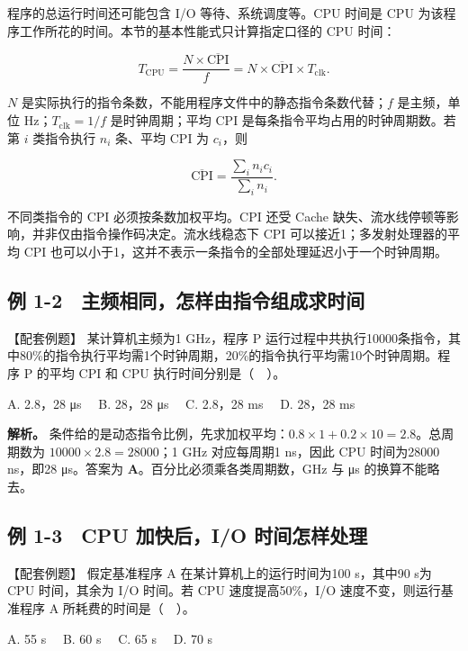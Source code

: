 程序的总运行时间还可能包含 I/O 等待、系统调度等。CPU 时间是 CPU 为该程序工作所花的时间。本节的基本性能式只计算指定口径的 CPU 时间：

\[
T_{\mathrm{CPU}}=\frac{N\times\overline{\mathrm{CPI}}}{f}
=N\times\overline{\mathrm{CPI}}\times T_{\mathrm{clk}}.
\]

\(N\) 是实际执行的指令条数，不能用程序文件中的静态指令条数代替；\(f\) 是主频，单位 Hz；\(T_{\mathrm{clk}}=1/f\) 是时钟周期；平均 CPI 是每条指令平均占用的时钟周期数。若第 \(i\) 类指令执行 \(n_i\) 条、平均 CPI 为 \(c_i\)，则

\[
\overline{\mathrm{CPI}}=\frac{\sum_i n_i c_i}{\sum_i n_i}.
\]

不同类指令的 CPI 必须按条数加权平均。CPI 还受 Cache 缺失、流水线停顿等影响，并非仅由指令操作码决定。流水线稳态下 CPI 可以接近1；多发射处理器的平均 CPI 也可以小于1，这并不表示一条指令的全部处理延迟小于一个时钟周期。

\subsection{例 1-2　主频相同，怎样由指令组成求时间}\label{CO01-08}

\begin{example}[配套例题]

【配套例题】 某计算机主频为1 GHz，程序 P 运行过程中共执行10000条指令，其中80\%的指令执行平均需1个时钟周期，20\%的指令执行平均需10个时钟周期。程序 P 的平均 CPI 和 CPU 执行时间分别是（　）。

A. 2.8，28 μs　 B. 28，28 μs　 C. 2.8，28 ms　 D. 28，28 ms

\end{example}

\textbf{解析。} 条件给的是动态指令比例，先求加权平均：\(0.8\times1+0.2\times10=2.8\)。总周期数为 \(10000\times2.8=28000\)；1 GHz 对应每周期1 ns，因此 CPU 时间为28000 ns，即28 μs。答案为 \textbf{A}。百分比必须乘各类周期数，GHz 与 μs 的换算不能略去。

\subsection{例 1-3　CPU 加快后，I/O 时间怎样处理}\label{CO01-09}

\begin{example}[配套例题]

【配套例题】 假定基准程序 A 在某计算机上的运行时间为100 s，其中90 s为 CPU 时间，其余为 I/O 时间。若 CPU 速度提高50\%，I/O 速度不变，则运行基准程序 A 所耗费的时间是（　）。

A. 55 s　 B. 60 s　 C. 65 s　 D. 70 s

\end{example}

